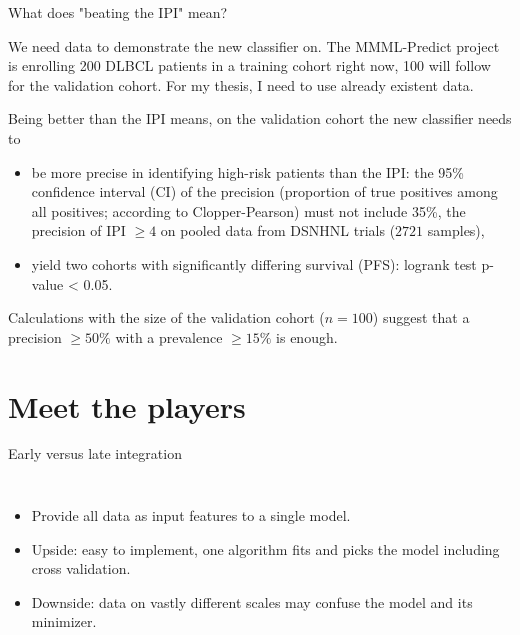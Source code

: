 \documentclass[10pt, aspectratio=169]{beamer}
\begin{document}
\begin{frame}{What does "beating the IPI" mean?}

  We need \alert{data} to demonstrate the new classifier on. The MMML-Predict project is enrolling 200 DLBCL 
  patients in a training cohort right now, 100 will follow for the validation cohort. For my thesis,
  I need to use already existent data.

  Being better than the IPI means, on the validation cohort the new classifier needs to 

  \begin{itemize}
    \item be \alert{more precise in identifying high-risk patients} than the IPI: the 95\% confidence interval (CI) 
    of the precision (proportion of true positives among all positives; according to Clopper-Pearson) must 
    not include 35\%, the precision of IPI $\geq 4$ on pooled data from DSNHNL trials ($\num{2721}$ samples),
    \item yield \alert{two cohorts with significantly differing survival} (PFS): logrank test p-value < 0.05.
  \end{itemize}

  Calculations with the size of the validation cohort ($n = 100$) suggest that a precision $\geq 50\%$ with a 
  prevalence $\geq 15\%$ is enough.
\end{frame}

\section{Meet the players}

\begin{frame}{\alert{Early} versus late integration}
  \begin{columns}
      \centering
      \begin{itemize}
        \item Provide all data as input features to a single model.
        \item Upside: easy to implement, one algorithm fits and picks the model 
          including cross validation.
        \item Downside: data on vastly different scales may confuse the model and 
          its minimizer.
      \end{itemize}
  \end{columns}
\end{frame}
\end{document}

